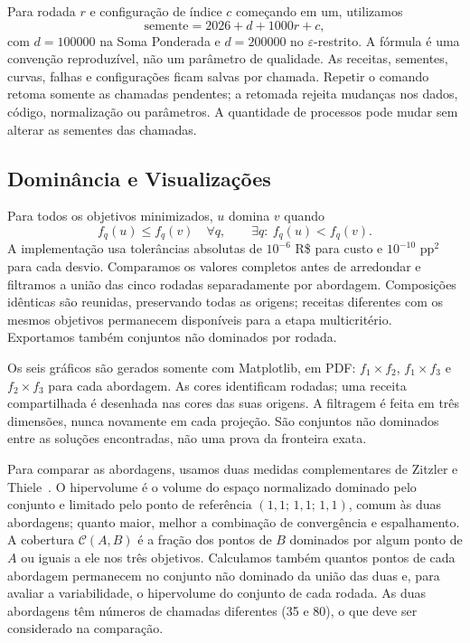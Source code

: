 \documentclass[conference]{IEEEtran}
\begin{document}
Para rodada $r$ e configuração de índice $c$ começando em um, utilizamos
\begin{equation}
\mathrm{semente}=2026+d+1000r+c,
\end{equation}
com $d=100000$ na Soma Ponderada e $d=200000$ no $\varepsilon$-restrito.
A fórmula é uma convenção reproduzível, não um parâmetro de qualidade.
As receitas, sementes, curvas, falhas e configurações ficam salvas por
chamada. Repetir o comando retoma somente as chamadas pendentes; a
retomada rejeita mudanças nos dados, código, normalização ou parâmetros.
A quantidade de processos pode mudar sem alterar as sementes das chamadas.

\subsection{Dominância e Visualizações}
Para todos os objetivos minimizados, $u$ domina $v$ quando
\begin{equation}
f_q(u)\leq f_q(v)\quad\forall q,
\qquad\exists q:\ f_q(u)<f_q(v).
\end{equation}
A implementação usa tolerâncias absolutas de $10^{-6}$ R\$ para custo e
$10^{-10}$ pp$^2$ para cada desvio. Comparamos os valores completos antes de
arredondar e filtramos a união das cinco rodadas separadamente por abordagem.
Composições idênticas são reunidas, preservando todas as origens; receitas
diferentes com os mesmos objetivos permanecem disponíveis para a etapa
multicritério. Exportamos também conjuntos não dominados por rodada.

Os seis gráficos são gerados somente com Matplotlib, em PDF: $f_1\times f_2$,
$f_1\times f_3$ e $f_2\times f_3$ para cada abordagem. As cores identificam
rodadas; uma receita compartilhada é desenhada nas cores das suas origens.
A filtragem é feita em três dimensões, nunca novamente em cada projeção.
São conjuntos não dominados entre as soluções encontradas, não uma prova
da fronteira exata.

Para comparar as abordagens, usamos duas medidas complementares de
Zitzler e Thiele~\cite{zitzler1999}. O hipervolume é o volume do espaço
normalizado dominado pelo conjunto e limitado pelo ponto de referência
$(1{,}1;\,1{,}1;\,1{,}1)$, comum às duas abordagens; quanto maior, melhor a
combinação de convergência e espalhamento. A cobertura $\mathcal{C}(A,B)$ é a
fração dos pontos de $B$ dominados por algum ponto de $A$ ou iguais a ele nos
três objetivos. Calculamos também quantos pontos de cada abordagem permanecem
no conjunto não dominado da união das duas e, para avaliar a variabilidade,
o hipervolume do conjunto de cada rodada. As duas abordagens têm números de
chamadas diferentes (35 e 80), o que deve ser considerado na comparação.
\end{document}
